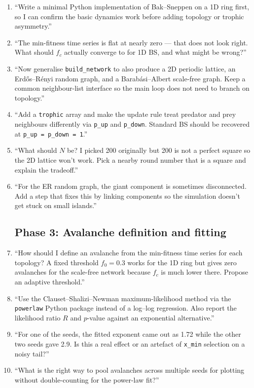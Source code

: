\documentclass[11pt,a4paper]{article}
\begin{document}
\begin{enumerate}
\subsection*{Phase 2: Simulator construction}
\item ``Write a minimal Python implementation of Bak--Sneppen on a 1D ring first, so I can confirm the basic dynamics work before adding topology or trophic asymmetry.''
\item ``The min-fitness time series is flat at nearly zero --- that does not look right. What should $f_c$ actually converge to for 1D BS, and what might be wrong?''
\item ``Now generalise \texttt{build\_network} to also produce a 2D periodic lattice, an Erd\H{o}s--R\'enyi random graph, and a Barab\'asi--Albert scale-free graph. Keep a common neighbour-list interface so the main loop does not need to branch on topology.''
\item ``Add a \texttt{trophic} array and make the update rule treat predator and prey neighbours differently via \texttt{p\_up} and \texttt{p\_down}. Standard BS should be recovered at \texttt{p\_up = p\_down = 1}.''
\item ``What should $N$ be? I picked 200 originally but 200 is not a perfect square so the 2D lattice won't work. Pick a nearby round number that is a square and explain the tradeoff.''
\item ``For the ER random graph, the giant component is sometimes disconnected. Add a step that fixes this by linking components so the simulation doesn't get stuck on small islands.''

\subsection*{Phase 3: Avalanche definition and fitting}
\item ``How should I define an avalanche from the min-fitness time series for each topology? A fixed threshold $f_0 = 0.3$ works for the 1D ring but gives zero avalanches for the scale-free network because $f_c$ is much lower there. Propose an adaptive threshold.''
\item ``Use the Clauset--Shalizi--Newman maximum-likelihood method via the \texttt{powerlaw} Python package instead of a log--log regression. Also report the likelihood ratio $R$ and $p$-value against an exponential alternative.''
\item ``For one of the seeds, the fitted exponent came out as 1.72 while the other two seeds gave 2.9. Is this a real effect or an artefact of \texttt{x\_min} selection on a noisy tail?''
\item ``What is the right way to pool avalanches across multiple seeds for plotting without double-counting for the power-law fit?''


\end{enumerate}
\end{document}
